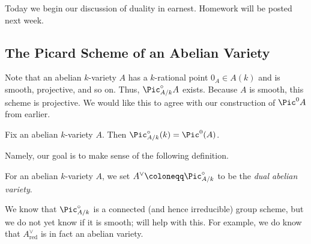 \documentclass[../notes.tex]{subfiles}
\begin{document}
Today we begin our discussion of duality in earnest. Homework will be posted next week.

\subsection{The Picard Scheme of an Abelian Variety}
Note that an abelian $k$-variety $A$ has a $k$-rational point $0_A\in A(k)$ and is smooth, projective, and so on. Thus, $\Pic^\circ_{A/k}A$ exists. Because $A$ is smooth, this scheme is projective. We would like this to agree with our construction of $\Pic^0A$ from earlier.
\begin{theorem} \label{thm:pic-zero}
	Fix an abelian $k$-variety $A$. Then $\Pic^\circ_{A/k}(k)=\Pic^0(A)$.
\end{theorem}
Namely, our goal is to make sense of the following definition.
\begin{definition}
	For an abelian $k$-variety $A$, we set $A^\lor\coloneqq\Pic^\circ_{A/k}$ to be the \textit{dual abelian variety}.
\end{definition}
We know that $\Pic^\circ_{A/k}$ is a connected (and hence irreducible) group scheme, but we do not yet know if it is smooth;  will help with this. For example, we do know that $A^\lor_{\mathrm{red}}$ is in fact an abelian variety.
\end{document}
